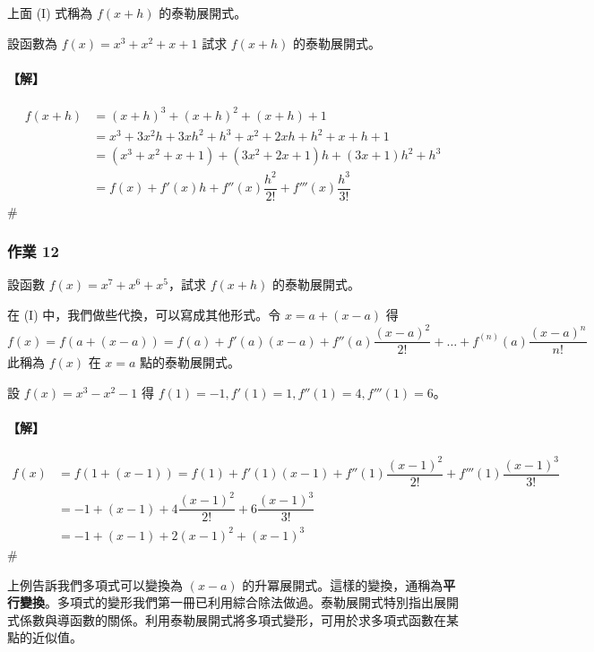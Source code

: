 上面 (I) 式稱為 $f(x+h)$ 的泰勒展開式。

\begin{example}\label{ex:b6s-2-19}
設函數為 $f(x)=x^3+x^2+x+1$ 試求 $f(x+h)$ 的泰勒展開式。
\end{example}

\paragraph{【解】}
\begin{align*}
f(x+h) &= (x+h)^3 + (x+h)^2 + (x+h) + 1 \\
&= x^3+3x^2h+3xh^2+h^3 + x^2+2xh+h^2 + x+h + 1 \\
&= (x^3+x^2+x+1) + (3x^2+2x+1)h + (3x+1)h^2 + h^3 \\
&= f(x) + f'(x)h + f''(x)\dfrac{h^2}{2!} + f'''(x)\dfrac{h^3}{3!}
\end{align*}
\hfill$\#$

\subsubsection*{作業 12}\label{hw:b6s-2-12}
設函數 $f(x)=x^7+x^6+x^5$，試求 $f(x+h)$ 的泰勒展開式。

在 (I) 中，我們做些代換，可以寫成其他形式。令 $x=a+(x-a)$ 得
\begin{equation}
f(x) = f(a+(x-a)) = f(a) + f'(a)(x-a) + f''(a)\dfrac{(x-a)^2}{2!} + \dots + f^{(n)}(a)\dfrac{(x-a)^n}{n!} \tag{II} \label{eq:b6s-2-4-taylor-II}
\end{equation}
此稱為 $f(x)$ 在 $x=a$ 點的泰勒展開式。

\begin{example}\label{ex:b6s-2-20}
設 $f(x)=x^3-x^2-1$ 得 $f(1)=-1, f'(1)=1, f''(1)=4, f'''(1)=6$。
\end{example}

\paragraph{【解】}
\begin{align*}
f(x) &= f(1+(x-1)) = f(1) + f'(1)(x-1) + f''(1)\dfrac{(x-1)^2}{2!} + f'''(1)\dfrac{(x-1)^3}{3!} \\
&= -1 + (x-1) + 4\dfrac{(x-1)^2}{2!} + 6\dfrac{(x-1)^3}{3!} \\
&= -1 + (x-1) + 2(x-1)^2 + (x-1)^3
\end{align*}
\hfill$\#$

上例告訴我們多項式可以變換為 $(x-a)$ 的升冪展開式。這樣的變換，通稱為\textbf{平行變換}。多項式的變形我們第一冊已利用綜合除法做過。泰勒展開式特別指出展開式係數與導函數的關係。利用泰勒展開式將多項式變形，可用於求多項式函數在某點的近似值。

